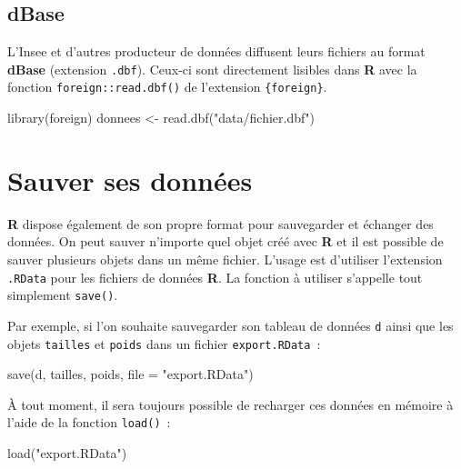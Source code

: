 \documentclass[
  letterpaper,
  DIV=11,
  numbers=noendperiod,
  oneside]{scrreprt}
\newenvironment{Shaded}{\begin{snugshade}}{\end{snugshade}}
\newcommand{\AttributeTok}[1]{\textcolor[rgb]{0.40,0.45,0.13}{#1}}
\newcommand{\FunctionTok}[1]{\textcolor[rgb]{0.28,0.35,0.67}{#1}}
\newcommand{\NormalTok}[1]{\textcolor[rgb]{0.00,0.23,0.31}{#1}}
\newcommand{\OtherTok}[1]{\textcolor[rgb]{0.00,0.23,0.31}{#1}}
\newcommand{\StringTok}[1]{\textcolor[rgb]{0.13,0.47,0.30}{#1}}
\begin{document}
\hypertarget{dbase}{%
\subsection{dBase}\label{dbase}}

L'Insee et d'autres producteur de données diffusent leurs fichiers au
format \textbf{dBase} (extension \texttt{.dbf}). Ceux-ci sont
directement lisibles dans \textbf{R} avec la fonction
\texttt{foreign::read.dbf()} de l'extension \texttt{\{foreign\}}.

\begin{Shaded}
\begin{Highlighting}[]
\FunctionTok{library}\NormalTok{(foreign)}
\NormalTok{donnees }\OtherTok{\textless{}{-}} \FunctionTok{read.dbf}\NormalTok{(}\StringTok{"data/fichier.dbf"}\NormalTok{)}
\end{Highlighting}
\end{Shaded}

\hypertarget{sauver-ses-donnuxe9es}{%
\section{Sauver ses données}\label{sauver-ses-donnuxe9es}}

\textbf{R} dispose également de son propre format pour sauvegarder et
échanger des données. On peut sauver n'importe quel objet créé avec
\textbf{R} et il est possible de sauver plusieurs objets dans un même
fichier. L'usage est d'utiliser l'extension \texttt{.RData} pour les
fichiers de données \textbf{R}. La fonction à utiliser s'appelle tout
simplement \texttt{save()}.

Par exemple, si l'on souhaite sauvegarder son tableau de données
\texttt{d} ainsi que les objets \texttt{tailles} et \texttt{poids} dans
un fichier \texttt{export.RData}~:

\begin{Shaded}
\begin{Highlighting}[]
\FunctionTok{save}\NormalTok{(d, tailles, poids, }\AttributeTok{file =} \StringTok{"export.RData"}\NormalTok{)}
\end{Highlighting}
\end{Shaded}

À tout moment, il sera toujours possible de recharger ces données en
mémoire à l'aide de la fonction \texttt{load()}~:

\begin{Shaded}
\begin{Highlighting}[]
\FunctionTok{load}\NormalTok{(}\StringTok{"export.RData"}\NormalTok{)}
\end{Highlighting}
\end{Shaded}
\end{document}
